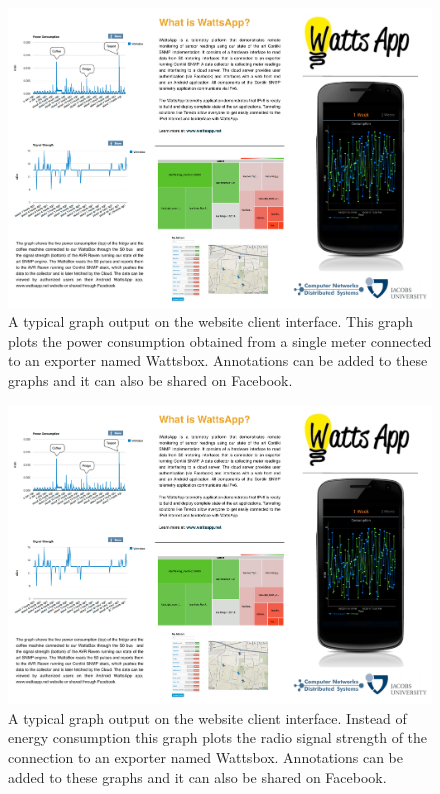 \documentclass[10pt, conference, compsocconf, english]{IEEEtran}
\begin{document}
\begin{figure}[t]
\begin{centering}
\includegraphics[scale=0.93]{images/power-consumption} 
\par\end{centering}

\caption{A typical graph output on the website client interface. This graph
plots the power consumption obtained from a single meter connected
to an exporter named Wattsbox. Annotations can be added to these graphs
and it can also be shared on Facebook. }


\label{fig:website-power-consumption}
\end{figure}


\begin{figure}[t]
\begin{centering}
\includegraphics[scale=0.93]{images/signal-strength} 
\par\end{centering}

\caption{A typical graph output on the website client interface. Instead of
energy consumption this graph plots the radio signal strength of the
connection to an exporter named Wattsbox. Annotations can be added
to these graphs and it can also be shared on Facebook. }


\label{fig:website-signal-strength}
\end{figure}
\end{document}
